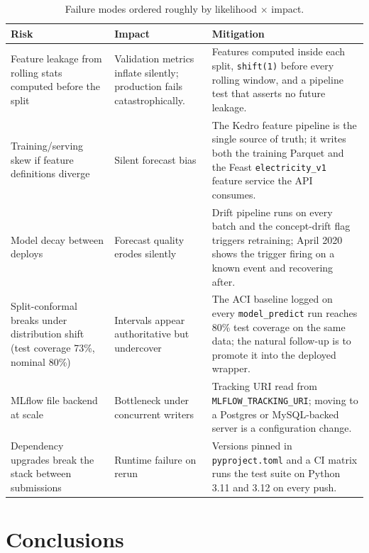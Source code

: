 \documentclass[11pt,a4paper]{article}
\newcommand{\code}[1]{\texttt{\small #1}}
\begin{document}
\begin{table}[H]
\centering
\footnotesize
\renewcommand{\arraystretch}{1.4}
\begin{tabularx}{\linewidth}{@{} Y{0.7} Y{0.6} Y{1.7} @{}}
\toprule
\textbf{Risk} & \textbf{Impact} & \textbf{Mitigation} \\
\midrule
Feature leakage from rolling stats computed before the split & Validation metrics inflate silently; production fails catastrophically. & Features computed inside each split, \code{shift(1)} before every rolling window, and a pipeline test that asserts no future leakage. \\
Training/serving skew if feature definitions diverge & Silent forecast bias & The Kedro feature pipeline is the single source of truth; it writes both the training Parquet and the Feast \code{electricity\_v1} feature service the API consumes. \\
Model decay between deploys & Forecast quality erodes silently & Drift pipeline runs on every batch and the concept-drift flag triggers retraining; April 2020 shows the trigger firing on a known event and recovering after. \\
Split-conformal breaks under distribution shift (test coverage 73\%, nominal 80\%) & Intervals appear authoritative but undercover & The ACI baseline logged on every \code{model\_predict} run reaches 80\% test coverage on the same data; the natural follow-up is to promote it into the deployed wrapper. \\
MLflow file backend at scale & Bottleneck under concurrent writers & Tracking URI read from \code{MLFLOW\_TRACKING\_URI}; moving to a Postgres or MySQL-backed server is a configuration change. \\
Dependency upgrades break the stack between submissions & Runtime failure on rerun & Versions pinned in \code{pyproject.toml} and a CI matrix runs the test suite on Python 3.11 and 3.12 on every push. \\
\bottomrule
\end{tabularx}
\caption{Failure modes ordered roughly by likelihood $\times$ impact.}
\label{tab:risks}
\end{table}

\section{Conclusions}
\end{document}
